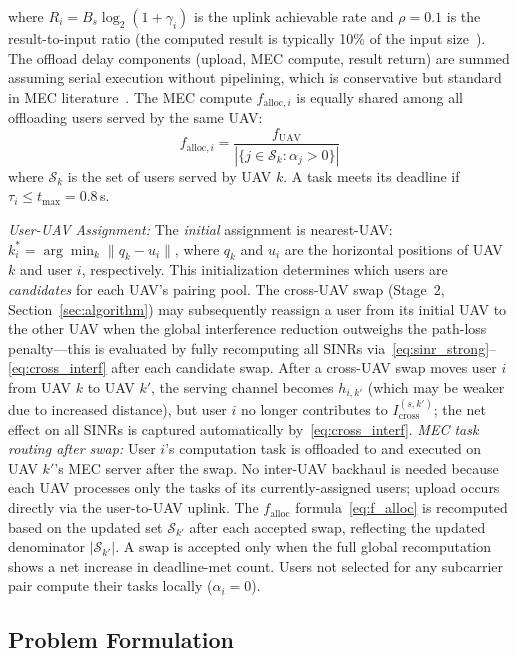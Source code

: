 \documentclass[journal]{IEEEtran}
\begin{document}
where $R_i = B_s \log_2(1 + \gamma_i)$ is the uplink achievable rate and $\rho = 0.1$ is the result-to-input ratio (the computed result is typically 10\% of the input size~\cite{mao2017survey}).
The offload delay components (upload, MEC compute, result return) are summed assuming serial execution without pipelining, which is conservative but standard in MEC literature~\cite{mao2017survey}.
The MEC compute $f_{\text{alloc},i}$ is equally shared among all offloading users served by the same UAV:
\begin{equation}
    f_{\text{alloc},i} = \frac{f_{\text{UAV}}}{|\{j \in \mathcal{S}_k : \alpha_j > 0\}|}
    \label{eq:f_alloc}
\end{equation}
where $\mathcal{S}_k$ is the set of users served by UAV $k$.
A task meets its deadline if $\tau_i \leq t_{\max} = 0.8$\,s.

\emph{User-UAV Assignment:}
The \emph{initial} assignment is nearest-UAV:
$k_i^* = \arg\min_k \|q_k - u_i\|$,
where $q_k$ and $u_i$ are the horizontal positions of UAV $k$ and user $i$, respectively.
This initialization determines which users are \emph{candidates} for each UAV's pairing pool.
The cross-UAV swap (Stage~2, Section~\ref{sec:algorithm}) may subsequently reassign a user from its initial UAV to the other UAV when the global interference reduction outweighs the path-loss penalty---this is evaluated by fully recomputing all SINRs via~\eqref{eq:sinr_strong}--\eqref{eq:cross_interf} after each candidate swap.
After a cross-UAV swap moves user $i$ from UAV $k$ to UAV $k'$, the serving channel becomes $h_{i,k'}$ (which may be weaker due to increased distance), but user $i$ no longer contributes to $I_{\text{cross}}^{(s,k')}$; the net effect on all SINRs is captured automatically by~\eqref{eq:cross_interf}.
\emph{MEC task routing after swap:}
User $i$'s computation task is offloaded to and executed on UAV $k'$'s MEC server after the swap.
No inter-UAV backhaul is needed because each UAV processes only the tasks of its currently-assigned users; upload occurs directly via the user-to-UAV uplink.
The $f_{\text{alloc}}$ formula~\eqref{eq:f_alloc} is recomputed based on the updated set $\mathcal{S}_{k'}$ after each accepted swap, reflecting the updated denominator $|\mathcal{S}_{k'}|$.
A swap is accepted only when the full global recomputation shows a net increase in deadline-met count.
Users not selected for any subcarrier pair compute their tasks locally ($\alpha_i = 0$).

\subsection{Problem Formulation}
\end{document}
